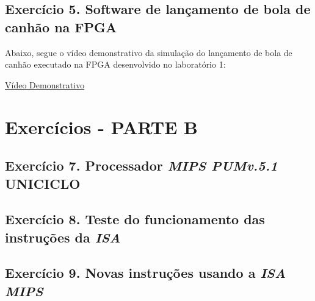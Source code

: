 \documentclass[12pt]{article}
\begin{document}
\subsection{Exercício 5. Software de lançamento de bola de canhão na FPGA}
\label{subsec:canhao}

Abaixo, segue o vídeo demonstrativo da simulação do lançamento de bola de canhão executado na FPGA desenvolvido no laboratório 1:

\href{https://youtu.be/ipDxgTOtXDA}{Vídeo Demonstrativo}


\section{Exercícios - PARTE B}
\label{sec:exerciciosB}

\subsection{Exercício 7. Processador \textit{MIPS PUMv.5.1} UNICICLO}
\label{subsec:mips_uniciclo}


\subsection{Exercício 8. Teste do funcionamento das instruções da \textit{ISA}}
\label{subsec:testeisa}
 
\subsection{Exercício 9. Novas instruções usando a \textit{ISA MIPS}}
\label{subsec:newint}



\end{document}
